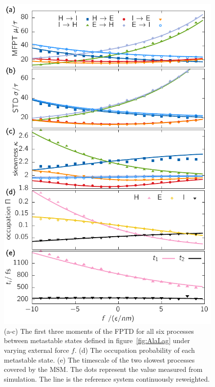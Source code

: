 \begin{figure}
\centering
 \includegraphics{../plots/Frew/mom_1001.pdf}
 \caption[The first three moments, the population of metastable states and the first two timescales for the tetraalanine peptide for varying driving along the end-to-end distance.]{(a-c) The first three moments of the FPTD for all six processes between metastable states defined in figure~\ref{fig:AlaLag} under varying external force $f$. (d) The occupation probability of each metastable state. (e) The timescale of the two slowest processes covered by the MSM. The dots represent the value measured from simulation. The line is the reference system continuously reweighted.   }
 \label{fig:momAlaR}
\end{figure}


